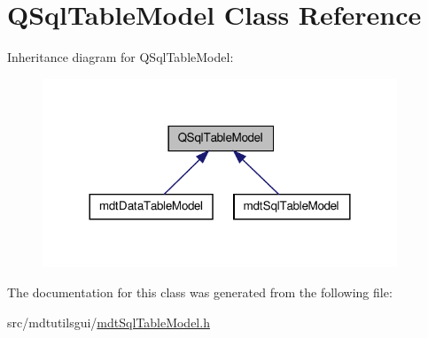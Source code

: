 \hypertarget{class_q_sql_table_model}{\section{Q\-Sql\-Table\-Model Class Reference}
\label{class_q_sql_table_model}
}


Inheritance diagram for Q\-Sql\-Table\-Model\-:
\nopagebreak
\begin{figure}[H]
\begin{center}
\leavevmode
\includegraphics[width=300pt]{class_q_sql_table_model__inherit__graph}
\end{center}
\end{figure}


The documentation for this class was generated from the following file\-:\begin{DoxyCompactItemize}
\item 
src/mdtutilsgui/\hyperlink{mdt_sql_table_model_8h}{mdt\-Sql\-Table\-Model.\-h}\end{DoxyCompactItemize}
